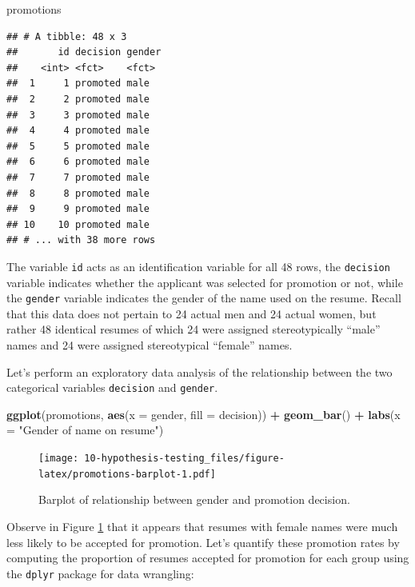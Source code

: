 \documentclass[
]{book}
\newenvironment{Shaded}{\begin{snugshade}}{\end{snugshade}}
\newcommand{\DataTypeTok}[1]{\textcolor[rgb]{0.13,0.29,0.53}{#1}}
\newcommand{\KeywordTok}[1]{\textcolor[rgb]{0.13,0.29,0.53}{\textbf{#1}}}
\newcommand{\NormalTok}[1]{#1}
\newcommand{\OperatorTok}[1]{\textcolor[rgb]{0.81,0.36,0.00}{\textbf{#1}}}
\newcommand{\StringTok}[1]{\textcolor[rgb]{0.31,0.60,0.02}{#1}}
\begin{document}
\begin{Shaded}
\begin{Highlighting}[]
\NormalTok{promotions}
\end{Highlighting}
\end{Shaded}

\begin{verbatim}
## # A tibble: 48 x 3
##       id decision gender
##    <int> <fct>    <fct> 
##  1     1 promoted male  
##  2     2 promoted male  
##  3     3 promoted male  
##  4     4 promoted male  
##  5     5 promoted male  
##  6     6 promoted male  
##  7     7 promoted male  
##  8     8 promoted male  
##  9     9 promoted male  
## 10    10 promoted male  
## # ... with 38 more rows
\end{verbatim}

The variable \texttt{id} acts as an identification variable for all 48 rows, the \texttt{decision} variable indicates whether the applicant was selected for promotion or not, while the \texttt{gender} variable indicates the gender of the name used on the resume. Recall that this data does not pertain to 24 actual men and 24 actual women, but rather 48 identical resumes of which 24 were assigned stereotypically ``male'' names and 24 were assigned stereotypical ``female'' names.

Let's perform an exploratory data analysis of the relationship between the two categorical variables \texttt{decision} and \texttt{gender}.

\begin{Shaded}
\begin{Highlighting}[]
\KeywordTok{ggplot}\NormalTok{(promotions, }\KeywordTok{aes}\NormalTok{(}\DataTypeTok{x =}\NormalTok{ gender, }\DataTypeTok{fill =}\NormalTok{ decision)) }\OperatorTok{+}
\StringTok{  }\KeywordTok{geom_bar}\NormalTok{() }\OperatorTok{+}
\StringTok{  }\KeywordTok{labs}\NormalTok{(}\DataTypeTok{x =} \StringTok{"Gender of name on resume"}\NormalTok{)}
\end{Highlighting}
\end{Shaded}

\begin{figure}
\centering
\texttt{[image: 10-hypothesis-testing\_files/figure-latex/promotions-barplot-1.pdf]}
\caption{\label{fig:promotions-barplot}Barplot of relationship between gender and promotion decision.}
\end{figure}

Observe in Figure \ref{fig:promotions-barplot} that it appears that resumes with female names were much less likely to be accepted for promotion. Let's quantify these promotion rates by computing the proportion of resumes accepted for promotion for each group using the \texttt{dplyr} package for data wrangling:
\end{document}
